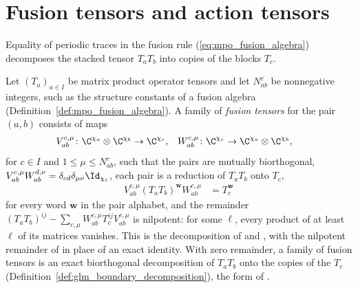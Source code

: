 \section{Fusion tensors and action tensors}%
\label{sec:mpoalg_virtual}

Equality of periodic traces in the fusion rule (\ref{eq:mpo_fusion_algebra})
decomposes the stacked tensor $T_aT_b$ into copies of the blocks $T_c$.

\begin{definition}%
    \label{def:mpoalg_fusion_tensors}
    \leanok
    Let $(T_a)_{a\in I}$ be matrix product operator tensors and let
    $N_{ab}^c$ be nonnegative integers, such as the structure constants of a
    fusion algebra (Definition~\ref{def:mpo_fusion_algebra}). A family of
    \emph{fusion tensors} for the pair $(a,b)$ consists of maps
    \begin{align}
        V_{ab}^{c,\mu} & \colon\C^{\chi_a}\otimes\C^{\chi_b}\to\C^{\chi_c}, &
        W_{ab}^{c,\mu} & \colon\C^{\chi_c}\to\C^{\chi_a}\otimes\C^{\chi_b},
        \label{eq:mpoalg_fusion_maps}
    \end{align}
    for $c\in I$ and $1\leq\mu\leq N_{ab}^c$, such that the pairs are mutually
    biorthogonal, $V_{ab}^{c,\mu}W_{ab}^{d,\nu}=\delta_{cd}\delta_{\mu\nu}
        \Id_{\chi_c}$, each pair is a reduction of $T_aT_b$ onto $T_c$,
    \begin{align}
        V_{ab}^{c,\mu}(T_aT_b)^{\mathbf w}W_{ab}^{c,\mu}
         & =T_c^{\mathbf w}
        \label{eq:mpoalg_fusion_reduction}
    \end{align}
    for every word $\mathbf w$ in the pair alphabet, and the remainder
    $(T_aT_b)^{ij}-\sum_{c,\mu}W_{ab}^{c,\mu}T_c^{ij}V_{ab}^{c,\mu}$ is
    nilpotent: for some $\ell$, every product of at least $\ell$ of its
    matrices vanishes. This is the decomposition of
    \cite[Section~2]{GarreRubio2023MPOSym} and
    \cite{Bultinck2017Anyons}, with the nilpotent remainder of
    \cite[Section~4.4]{GarreRubio2023MPOSym} in place of an exact identity.
    With zero remainder, a family of fusion tensors is an exact biorthogonal
    decomposition of $T_aT_b$ onto the copies of the $T_c$
    (Definition~\ref{def:glm_boundary_decomposition}), the form of
    \cite[Section~2]{GarreRubio2023MPOSym}.
\end{definition}

